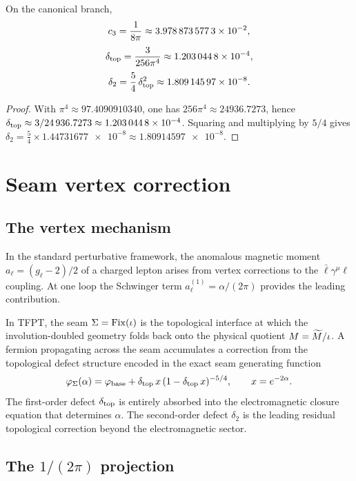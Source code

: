 \begin{lemma}\label{lem:numerics}
On the canonical branch,
\[
c_3=\frac{1}{8\pi}\approx\num{3.9788735773e-2},
\]
\[
\delta_{\mathrm{top}}=\frac{3}{256\pi^4}\approx\num{1.2030448e-4},
\]
\begin{equation}\label{eq:delta2-numerical}
\delta_2=\frac54\,\delta_{\mathrm{top}}^2\approx\num{1.80914597e-8}.
\end{equation}
\end{lemma}

\begin{proof}
With $\pi^4\approx\num{97.4090910340}$, one has
$256\pi^4\approx\num{24936.7273}$, hence
$\delta_{\mathrm{top}}\approx3/\num{24936.7273}\approx\num{1.2030448e-4}$.
Squaring and multiplying by $5/4$ gives
$\delta_2=\frac54\times\num{1.44731677e-8}\approx\num{1.80914597e-8}$.
\end{proof}


\section{Seam vertex correction}\label{sec:vertex}

\subsection{The vertex mechanism}\label{sec:vertex-mechanism}

In the standard perturbative framework, the anomalous magnetic moment
$a_\ell=(g_\ell-2)/2$ of a charged lepton arises from vertex corrections
to the $\bar\ell\gamma^\mu\ell$ coupling. At one loop the Schwinger term
$a_\ell^{(1)}=\alpha/(2\pi)$ provides the leading contribution.

In TFPT, the seam $\Sigma=\operatorname{Fix}(\iota)$ is the topological interface at which
the involution-doubled geometry folds back onto the physical quotient
$M=\widetilde M/\iota$. A fermion propagating across the seam accumulates a
correction from the topological defect structure encoded in the exact seam
generating function
\[
\varphi_{\Sigma}(\alpha)
=
\varphi_{\mathrm{base}}+\delta_{\mathrm{top}}\,x\,(1-\delta_{\mathrm{top}}\,x)^{-5/4},
\qquad
x=e^{-2\alpha}.
\]
The first-order defect $\delta_{\mathrm{top}}$ is entirely absorbed into the
electromagnetic closure equation that determines $\alpha$. The second-order
defect $\delta_2$ is the leading residual topological correction beyond the
electromagnetic sector.

\subsection{The \texorpdfstring{$1/(2\pi)$}{1/(2pi)} projection}

